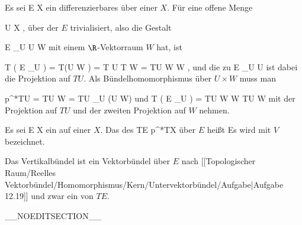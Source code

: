 {}
{

Es sei
 { E } { X
} {}
ein differenzierbares
über einer
$X$. Für eine offene Menge

\mavergleichskette
{\vergleichskette
{ U
}
{ \subseteq }{ X
}
{  }{
}
{    }{
}
{   }{
}
}
{}{}{,}
über der $E$ trivialisiert, also die Gestalt

\mavergleichskette
{\vergleichskette
{ E  \vert_U
}
{ \cong }{ U \times W
}
{  }{
}
{    }{
}
{   }{
}
}
{}{}{}
mit einem $\R$-Vektorraum $W$ hat, ist

\mavergleichskettedisp
{\vergleichskette
{ T  \left(  E \vert_U  \right)
}
{ =} { T(U \times  W )
}
{ =} { T U \times T W
}
{ =} { TU \times W \times W
}
{ } {
}
}
{}{}{,}
und die
zu
 {E \vert_U } { U
} {}
ist dabei die Projektion auf $TU$. Als Bündelhomomorphismus über $U \times W$ muss man

\mavergleichskettedisp
{\vergleichskette
{ p^*TU
}
{ =} { TU \times W
}
{ =} { TU \times_U (U \times W)
}
{ } {
}
{ } {
}
}
{}{}{}
und
\maabbdisp {} {T  \left(  E \vert_U  \right)  = TU \times W \times W  } { TU \times W
} {}
mit der Projektion auf $TU$ und der zweiten Projektion auf $W$ nehmen.

}

{}
{

Es sei
 { E } { X
} {}
ein
auf einer
$X$. Das
des
 {TE} {p^*TX
} {}
über $E$ heißt   Es wird mit $V$ bezeichnet.

}

Das Vertikalbündel ist ein Vektorbündel über $E$ nach
[[Topologischer Raum/Reelles Vektorbündel/Homomorphismus/Kern/Untervektorbündel/Aufgabe|Aufgabe 12.19]]
und zwar ein
von $TE$.

__NOEDITSECTION__

